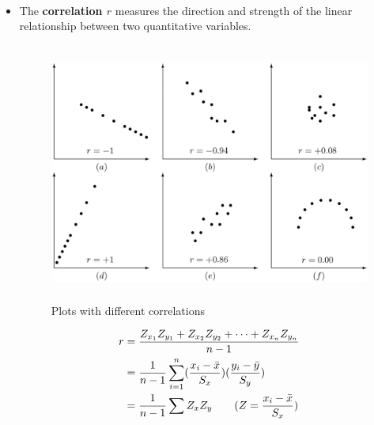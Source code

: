 \documentclass[Main.tex]{subfiles}
\begin{document}
	\begin{example} \hfill \\
		\begin{itemize}	
			\item The \textbf{correlation $r$} measures the direction and strength of the linear relationship between two quantitative variables.
			
			\begin{figure}[H]
				\centering
				\includegraphics[height=8.5cm,width=13cm]{correlation}
				\caption{Plots with different correlations}
				\label{correlation}
			\end{figure}
					
			\begin{definition}[Correlation]
			 	\begin{subequations}
			 		\begin{align}
			 		r&=\frac{Z_{x_{1}}Z_{y_{1}}+Z_{x_{2}}Z_{y_{2}}+\cdots+Z_{x_{n}}Z_{y_{n}}}{n-1}\\
			 		&=\frac{1}{n-1}\sum^{n}_{i=1}(\frac{x_{i}-\bar{x}}{S_{x}})(\frac{y_{i}-\bar{y}}{S_{y}})\\
			 		&=\frac{1}{n-1}\sum Z_{x}Z_{y} \qquad (Z=\frac{x_{i}-\bar{x}}{S_{x}})	\hfill	
				 	\end{align}
			 	\end{subequations}				
			\end{definition}\hfill %


\end{itemize}
\end{example}
\end{document}
